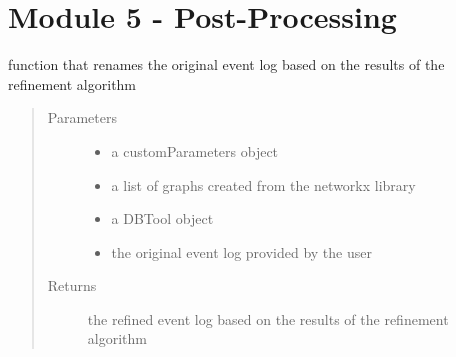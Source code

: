 \documentclass[letterpaper,10pt,english]{sphinxmanual}
\begin{document}
\begin{DUlineblock}{0em}
\item[] 
\end{DUlineblock}

{\hyperref[\detokenize{index:mastertoc}]{}}


\chapter{Module 5 - Post-Processing}
\label{\detokenize{postprocessing:module-5-post-processing}}\label{\detokenize{postprocessing::doc}}
\begin{DUlineblock}{0em}
\item[] 
\end{DUlineblock}

\begin{fulllineitems}
\label{\detokenize{postprocessing:eventLogProcessing.postProcessing.eventLogRenaming}}
function that renames the original event log based on the results of the refinement algorithm
\begin{quote}\begin{description}
\item[{Parameters}] \leavevmode\begin{itemize}
\item {} 
 \textendash{} a customParameters object

\item {} 
 \textendash{} a list of graphs created from the networkx library

\item {} 
 \textendash{} a DBTool object

\item {} 
 \textendash{} the original event log provided by the user

\end{itemize}

\item[{Returns}] \leavevmode
the refined event log based on the results of the refinement algorithm

\end{description}\end{quote}

\end{fulllineitems}
\end{document}
